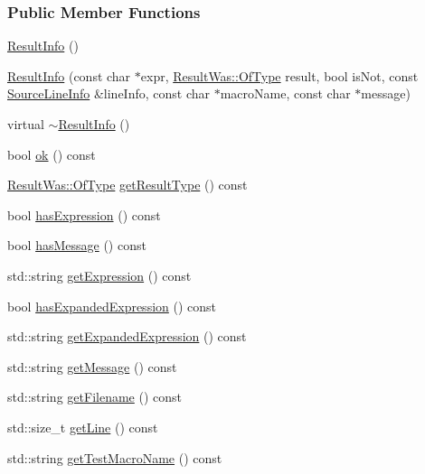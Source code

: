\subsubsection*{Public Member Functions}
\begin{DoxyCompactItemize}
\item 
\hyperlink{classCatch_1_1ResultInfo_a05f65ea6fe7473570d1759defb7f140e}{Result\-Info} ()
\item 
\hyperlink{classCatch_1_1ResultInfo_ada5567131ca4776dbd8a85e04e653537}{Result\-Info} (const char $\ast$expr, \hyperlink{structCatch_1_1ResultWas_a624e1ee3661fcf6094ceef1f654601ef}{Result\-Was\-::\-Of\-Type} result, bool is\-Not, const \hyperlink{structCatch_1_1SourceLineInfo}{Source\-Line\-Info} \&line\-Info, const char $\ast$macro\-Name, const char $\ast$message)
\item 
virtual \hyperlink{classCatch_1_1ResultInfo_a77b6c4d2076080ec4b5b35a0ae44ab60}{$\sim$\-Result\-Info} ()
\item 
bool \hyperlink{classCatch_1_1ResultInfo_abe3c9f3a08a1b24474156b41d1f5f475}{ok} () const 
\item 
\hyperlink{structCatch_1_1ResultWas_a624e1ee3661fcf6094ceef1f654601ef}{Result\-Was\-::\-Of\-Type} \hyperlink{classCatch_1_1ResultInfo_aa91115d5282c8a2d2244a15c205f9bfd}{get\-Result\-Type} () const 
\item 
bool \hyperlink{classCatch_1_1ResultInfo_a3a0aad5aa959e38220561fb0148f81b3}{has\-Expression} () const 
\item 
bool \hyperlink{classCatch_1_1ResultInfo_a5011c03f69a28a5b1b4e9c3666b39a35}{has\-Message} () const 
\item 
std\-::string \hyperlink{classCatch_1_1ResultInfo_ac03802ed3c08f2e086b0f6360206a142}{get\-Expression} () const 
\item 
bool \hyperlink{classCatch_1_1ResultInfo_a0fa3fd1f5c4c6608a25ad7e2d59eeb7d}{has\-Expanded\-Expression} () const 
\item 
std\-::string \hyperlink{classCatch_1_1ResultInfo_a10fa5c4c473bc8e42bb83a6cdb8b9d4b}{get\-Expanded\-Expression} () const 
\item 
std\-::string \hyperlink{classCatch_1_1ResultInfo_a74e8b2093a765ed0719e11b3a2e2a9d1}{get\-Message} () const 
\item 
std\-::string \hyperlink{classCatch_1_1ResultInfo_a98024a0ca14c34f07095d5c81f71523c}{get\-Filename} () const 
\item 
std\-::size\-\_\-t \hyperlink{classCatch_1_1ResultInfo_a45a5808fe131a449f1be011bc38bf2e8}{get\-Line} () const 
\item 
std\-::string \hyperlink{classCatch_1_1ResultInfo_a4dd8c29aa5be7bfb52b45b15ff56b17b}{get\-Test\-Macro\-Name} () const 
\end{DoxyCompactItemize}
